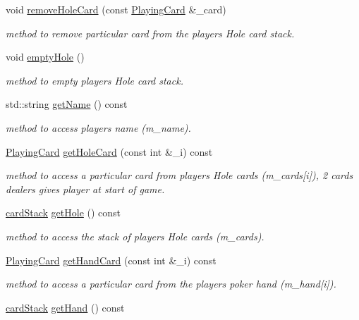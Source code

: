 \begin{DoxyCompactItemize}
void \hyperlink{classplayer_a9b2df592e33e9c0e47ba72a41f3ecd92}{remove\-Hole\-Card} (const \hyperlink{classPlayingCard}{Playing\-Card} \&\-\_\-card)
\begin{DoxyCompactList}\small\item\em method to remove particular card from the players Hole card stack. \end{DoxyCompactList}\item 
void \hyperlink{classplayer_a8b7237e077e12918291397a10202c334}{empty\-Hole} ()
\begin{DoxyCompactList}\small\item\em method to empty players Hole card stack. \end{DoxyCompactList}\item 
std\-::string \hyperlink{classplayer_a5e049a8e910a35a70cc99578a73cc979}{get\-Name} () const 
\begin{DoxyCompactList}\small\item\em method to access players name (m\-\_\-name). \end{DoxyCompactList}\item 
\hyperlink{classPlayingCard}{Playing\-Card} \hyperlink{classplayer_a05454c8c5c86b9e554843303199ca5b9}{get\-Hole\-Card} (const int \&\-\_\-i) const 
\begin{DoxyCompactList}\small\item\em method to access a particular card from players Hole cards (m\-\_\-cards\mbox{[}i\mbox{]}), 2 cards dealers gives player at start of game. \end{DoxyCompactList}\item 
\hyperlink{classcardStack}{card\-Stack} \hyperlink{classplayer_a2f60d18753bce9b146d08e72b4a2346d}{get\-Hole} () const 
\begin{DoxyCompactList}\small\item\em method to access the stack of players Hole cards (m\-\_\-cards). \end{DoxyCompactList}\item 
\hyperlink{classPlayingCard}{Playing\-Card} \hyperlink{classplayer_afd99bfe28c26ab807935fec5efeb50c6}{get\-Hand\-Card} (const int \&\-\_\-i) const 
\begin{DoxyCompactList}\small\item\em method to access a particular card from the players poker hand (m\-\_\-hand\mbox{[}i\mbox{]}). \end{DoxyCompactList}\item 
\hyperlink{classcardStack}{card\-Stack} \hyperlink{classplayer_a8fe96791d8b9f881c2bafd3f6f21b48e}{get\-Hand} () const 

\end{DoxyCompactItemize}
